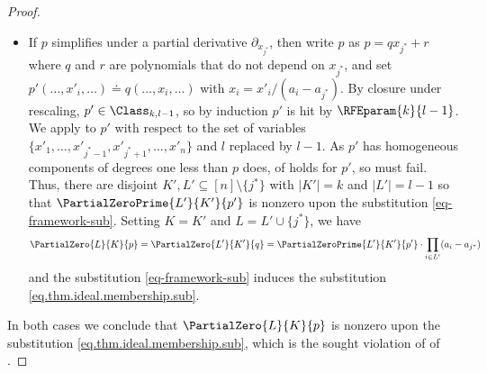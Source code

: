 \documentclass{toc}
\begin{document}
\begin{proof}
\begin{itemize}
      This means that  does not hold for $p'$.
      Thus, there must be disjoint $K',L' \subseteq [n]\setminus\{j^*\}$
      with $|K'|=k-1$ and $|L'|=l$ so that $\PartialZeroPrime{L'}{K'}{p'}$ is nonzero upon the substitution
      \begin{equation}\label{eq-framework-sub}
        x'_i \gets z\cdot \frac%
          { \prod_{j \in K'} (a_i - a_{j}) }%
          { \prod_{j \in L'} (a_i - a_{j}) }.
      \end{equation}
      Setting $K = K' \cup \{j^*\}$ and $L=L'$, we have
      \[ \PartialZero{L}{K}{p} = \PartialZero{L'}{K'}{r} = \PartialZeroPrime{L'}{K'}{p'} \Big/ \prod_{i \in L'} (a_i-a_{j^*}) \]
      and the substitution \eqref{eq-framework-sub} induces the substitution \eqref{eq.thm.ideal.membership.sub}.
      \item
      If $p$ simplifies under a partial derivative
      \(\partial_{x_{j^*}}\),
      then write $p$ as $p = q x_{j^*} + r$ where $q$ and $r$ are polynomials that do not depend on $x_{j^*}$,
      and set
      $p'(\dots, x'_i, \dots) \doteq q(\dots, x_i, \dots)$ with $x_i=x'_i / (a_i-a_{j^*})$. By closure under rescaling, $p'\in \Class_{k,l-1}$, so by induction $p'$ is hit by \(\RFEparam{k}{l-1}\).
      We apply  to $p'$ with respect to the set of
      variables \(\{x'_1,\ldots,x'_{j^*-1},x'_{j^*+1},\ldots,x'_n\}\) and $l$ replaced by $l-1$.
      As $p'$ has homogeneous components of degrees one less than $p$ does,
       of
       holds for $p'$, so  must fail. Thus, 
      there are disjoint $K',L' \subseteq [n]\setminus\{j^*\}$ with
      $|K'|=k$ and $|L'|=l-1$ so that $\PartialZeroPrime{L'}{K'}{p'}$ is nonzero upon the substitution
      \eqref{eq-framework-sub}.
      Setting $K = K'$ and $L=L' \cup \{j^*\}$, we have 
      \[ \PartialZero{L}{K}{p} = \PartialZero{L'}{K'}{q} = \PartialZeroPrime{L'}{K'}{p'} \cdot \prod_{i \in L'} (a_i-a_{j^*}) \]
      and the substitution \eqref{eq-framework-sub} induces the substitution \eqref{eq.thm.ideal.membership.sub}. 
  \end{itemize}
  In both cases we conclude that $\PartialZero{L}{K}{p}$ is nonzero upon the substitution \eqref{eq.thm.ideal.membership.sub}, which is the sought violation of  of .
\end{proof}
\end{document}
